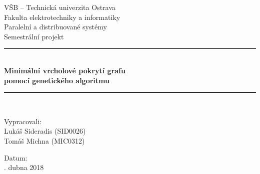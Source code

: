 \newcommand{\HRule}{\rule{\linewidth}{0.3mm}}

\begin{titlepage}

\begin{center}

{\sffamily \Large V\v{S}B – Technická univerzita Ostrava} \\[1.5mm]
{\sffamily \Large Fakulta elektrotechniky a informatiky} \\[6.5cm]

{\sffamily \LARGE Paralelní a distribuované systémy}\\[0.3cm]
{\sffamily \LARGE Semestrální projekt}\\[0.4cm]

\HRule \\[0.3cm]
{ \sffamily \huge \bfseries Minimální vrcholové pokrytí grafu \\ pomocí genetického algoritmu\\[0.3cm] }
\HRule \\[6.5cm]

\noindent
\begin{minipage}{0.45\textwidth}
\begin{flushleft} \large
{\sffamily Vypracovali:}\\
{\sffamily Lukáš Sideradis (SID0026)}\\
{\sffamily Tomáš Michna \hspace{1mm}(MIC0312)}
\end{flushleft}
\end{minipage}%
\begin{minipage}{0.45\textwidth}
\begin{flushright} \large
{\sffamily Datum:} \\
{. dubna 2018} \\
\end{flushright}
\end{minipage}

\end{center}

\end{titlepage}

\tableofcontents

\clearpage

\pagestyle{plain}
\setcounter{page}{1}

